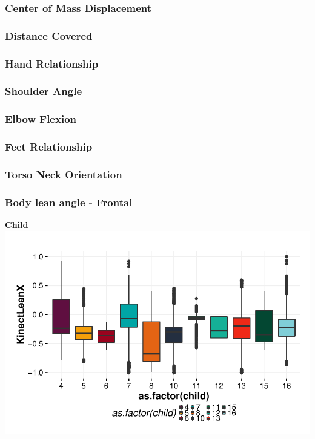\documentclass{article}
\begin{document}
\subsubsection{Center of Mass Displacement}

\subsubsection{Distance Covered}

\subsubsection{Hand Relationship}

\subsubsection{Shoulder Angle}

\subsubsection{Elbow Flexion}

\subsubsection{Feet Relationship}

\subsubsection{Torso Neck Orientation}

\subsubsection{Body lean angle - Frontal}
\textbf{Child}
\includegraphics{features-plot_leanx_child_quiz}
\end{document}
